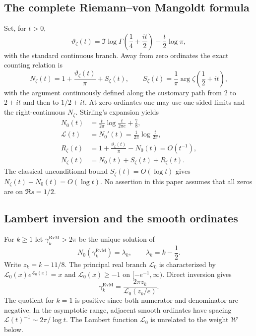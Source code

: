 \documentclass[11pt,leqno]{amsart}
\numberwithin{equation}{section}
\theoremstyle{definition}
\theoremstyle{remark}
\newcommand{\1}{\mathbf 1}
\newcommand{\tW}{\mathscr W}
\newcommand{\Lam}{\mathcal{L}_0}
\begin{document}
\subsection{The complete Riemann--von Mangoldt formula}\label{subsec:rvm}
Set, for $t>0$,
\begin{equation}\label{eq:theta-zeta}
 \vartheta_{\!\zeta}(t)=\Im\log\Gamma\left(\frac14+\frac{it}{2}\right)-\frac t2\log\pi,
\end{equation}
with the standard continuous branch. Away from zero ordinates the exact counting relation is
\begin{equation}\label{eq:full-rvm}
 N_\zeta(t)=1+\frac{\vartheta_{\!\zeta}(t)}\pi+S_\zeta(t),\qquad
 S_\zeta(t)=\frac1\pi\arg\zeta\left(\frac12+it\right),
\end{equation}
with the argument continuously defined along the customary path from $2$ to $2+it$ and then to $1/2+it$. At zero ordinates one may use one-sided limits and the right-continuous $N_\zeta$. Stirling's expansion yields
\begin{align}
 N_0(t)&=\frac{t}{2\pi}\log\frac{t}{2\pi e}+\frac78,\label{eq:N0}\\
 \mathcal L(t)&=N_0'(t)=\frac1{2\pi}\log\frac{t}{2\pi},\label{eq:spacing}\\
 R_\zeta(t)&=1+\frac{\vartheta_{\!\zeta}(t)}\pi-N_0(t)=O(t^{-1}),\label{eq:R-stir}\\
 N_\zeta(t)&=N_0(t)+S_\zeta(t)+R_\zeta(t).\label{eq:rvm-decomp}
\end{align}
The classical unconditional bound $S_\zeta(t)=O(\log t)$ gives $N_\zeta(t)-N_0(t)=O(\log t)$. No assertion in this paper assumes that all zeros are on $\Re s=1/2$.
\subsection{Lambert inversion and the smooth ordinates}
For $k\ge1$ let $\gamma_k^{\mathrm{RvM}}>2\pi$ be the unique solution of
\begin{equation}\label{eq:lambert-implicit}
 N_0(\gamma_k^{\mathrm{RvM}})=\lambda_k,\qquad\lambda_k=k-\frac12.
\end{equation}
Write $z_k=k-11/8$. The principal real branch $\Lam$ is characterized by $\Lam(x)e^{\Lam(x)}=x$ and $\Lam(x)\ge-1$ on $[-e^{-1},\infty)$. Direct inversion gives
\begin{equation}\label{eq:lambert-explicit}
 \boxed{\displaystyle \gamma_k^{\mathrm{RvM}}=\frac{2\pi z_k}{\Lam(z_k/e)}.}
\end{equation}
The quotient for $k=1$ is positive since both numerator and denominator are negative. In the asymptotic range, adjacent smooth ordinates have spacing $\mathcal L(t)^{-1}\sim2\pi/\log t$. The Lambert function $\Lam$ is unrelated to the weight $\tW$ below.
\end{document}
